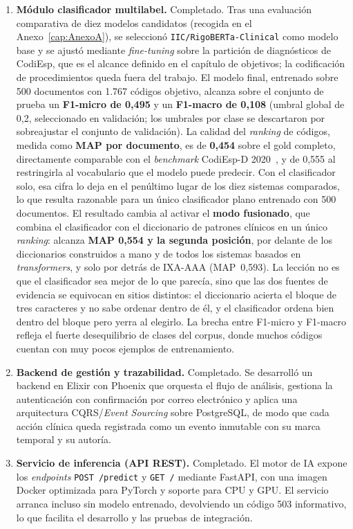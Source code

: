 \begin{enumerate}
 \item \textbf{Módulo clasificador multilabel.} Completado. Tras una evaluación comparativa de diez modelos candidatos (recogida en el Anexo~\ref{cap:AnexoA}), se seleccionó \texttt{IIC/RigoBERTa-Clinical} como modelo base y se ajustó mediante \emph{fine-tuning} sobre la partición de diagnósticos de CodiEsp, que es el alcance definido en el capítulo de objetivos; la codificación de procedimientos queda fuera del trabajo. El modelo final, entrenado sobre 500 documentos con 1.767 códigos objetivo, alcanza sobre el conjunto de prueba un \textbf{F1-micro de 0,495} y un \textbf{F1-macro de 0,108} (umbral global de 0,2, seleccionado en validación; los umbrales por clase se descartaron por sobreajustar el conjunto de validación). La calidad del \emph{ranking} de códigos, medida como \textbf{MAP por documento}, es de \textbf{0,454} sobre el gold completo, directamente comparable con el \emph{benchmark} CodiEsp-D 2020~\cite{miranda2020}, y de 0,555 al restringirla al vocabulario que el modelo puede predecir. Con el clasificador solo, esa cifra lo deja en el penúltimo lugar de los diez sistemas comparados, lo que resulta razonable para un único clasificador plano entrenado con 500 documentos. El resultado cambia al activar el \textbf{modo fusionado}, que combina el clasificador con el diccionario de patrones clínicos en un único \emph{ranking}: alcanza \textbf{MAP 0,554 y la segunda posición}, por delante de los diccionarios construidos a mano y de todos los sistemas basados en \emph{transformers}, y solo por detrás de IXA-AAA (MAP~0,593). La lección no es que el clasificador sea mejor de lo que parecía, sino que las dos fuentes de evidencia se equivocan en sitios distintos: el diccionario acierta el bloque de tres caracteres y no sabe ordenar dentro de él, y el clasificador ordena bien dentro del bloque pero yerra al elegirlo. La brecha entre F1-micro y F1-macro refleja el fuerte desequilibrio de clases del corpus, donde muchos códigos cuentan con muy pocos ejemplos de entrenamiento.

 \item \textbf{Backend de gestión y trazabilidad.} Completado. Se desarrolló un backend en Elixir con Phoenix que orquesta el flujo de análisis, gestiona la autenticación con confirmación por correo electrónico y aplica una arquitectura CQRS/\emph{Event Sourcing} sobre PostgreSQL, de modo que cada acción clínica queda registrada como un evento inmutable con su marca temporal y su autoría.

 \item \textbf{Servicio de inferencia (API REST).} Completado. El motor de IA expone los \emph{endpoints} \texttt{POST /predict} y \texttt{GET /} mediante FastAPI, con una imagen Docker optimizada para PyTorch y soporte para CPU y GPU. El servicio arranca incluso sin modelo entrenado, devolviendo un código 503 informativo, lo que facilita el desarrollo y las pruebas de integración.


\end{enumerate}
